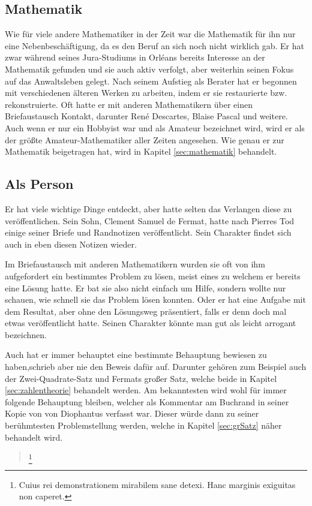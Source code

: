 \subsection{Mathematik} \label{sec:biografieMathematik}
Wie für viele andere Mathematiker in der Zeit war die Mathematik für ihn nur eine Nebenbeschäftigung, da es den Beruf  an sich noch nicht wirklich gab. Er hat zwar während seines Jura-Studiums in Orléans bereits Interesse an der Mathematik gefunden und sie auch aktiv verfolgt, aber weiterhin seinen Fokus auf das Anwaltsleben gelegt. Nach seinem Aufstieg als Berater hat er begonnen mit verschiedenen älteren Werken zu arbeiten, indem er sie restaurierte bzw. rekonstruierte. Oft hatte er mit anderen Mathematikern über einen Briefaustausch Kontakt, darunter René Descartes, Blaise Pascal und weitere. Auch wenn er nur ein Hobbyist war und als Amateur bezeichnet wird, wird er als der größte Amateur-Mathematiker aller Zeiten angesehen. \cite{mlodinow2011wenn, britannicaFermat} Wie genau er zur Mathematik beigetragen hat, wird in Kapitel \ref{sec:mathematik} behandelt.

\subsection{Als Person}\label{sec:person}
Er hat viele wichtige Dinge entdeckt, aber hatte selten das Verlangen diese zu veröffentlichen. Sein Sohn, Clement Samuel de Fermat, hatte nach Pierres Tod einige seiner Briefe und Randnotizen veröffentlicht. Sein Charakter findet sich auch in eben diesen Notizen wieder.

Im Briefaustausch mit anderen Mathematikern wurden sie oft von ihm aufgefordert ein bestimmtes Problem zu lösen, meist eines zu welchem er bereits eine Lösung hatte. Er bat sie also nicht einfach um Hilfe, sondern wollte nur schauen, wie schnell sie das Problem lösen konnten. Oder er hat eine Aufgabe mit dem Resultat, aber ohne den Lösungsweg präsentiert, falls er denn doch mal etwas veröffentlicht hatte. Seinen Charakter könnte man gut als leicht arrogant bezeichnen.

Auch hat er immer behauptet eine bestimmte Behauptung bewiesen zu haben,schrieb aber nie den Beweis dafür auf. Darunter gehören zum Beispiel auch der Zwei-Quadrate-Satz und Fermats großer Satz, welche beide in Kapitel \ref{sec:zahlentheorie} behandelt werden. Am bekanntesten wird wohl für immer folgende Behauptung bleiben, welcher als Kommentar am Buchrand in seiner Kopie von \textit{} von Diophantus verfasst war. Dieser würde dann zu seiner berühmtesten Problemstellung werden, welche in Kapitel \ref{sec:grSatz} näher behandelt wird.

\begin{quote}
    \footnote{Cuius rei demonstrationem mirabilem sane detexi. Hanc marginis exiguitas non caperet.}
\end{quote}
